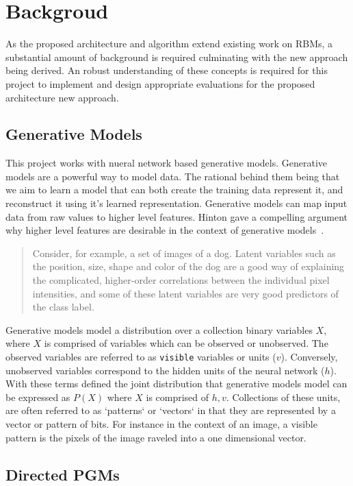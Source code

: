 \chapter{Backgroud}
As the proposed architecture and algorithm extend existing work on RBMs, a substantial amount of background is required culminating with the new approach being derived. An robust understanding of these concepts is required for this project to implement and design appropriate evaluations for the proposed architecture new approach.

\section{Generative Models}\label{S:Generative-Models}

This project works with nueral network based generative models.
Generative models are a powerful way to model data. The rational behind them being that we aim to learn a model that can both create the training data represent it, and reconstruct it using it's learned representation. Generative models can map input data from raw values to higher level features. Hinton gave a compelling argument why higher level features are desirable in the context of generative models~\cite{hinton:32723:vv}. \begin{quote} Consider, for example, a set of images of a dog. Latent variables such as the position, size, shape and color of the dog are a good way of explaining the complicated, higher-order correlations between the individual pixel intensities, and some of these latent variables are very good predictors of the class label.\end{quote}

Generative models model a distribution over a collection binary variables $X$, where $X$ is comprised of variables which can be observed or unobserved. The observed variables are referred to as \texttt{visible} variables or units ($v$). Conversely, unobserved variables correspond to the hidden units of the neural network ($h$). With these terms defined the joint distribution that generative models model can be expressed as $P(X)$ where $X$ is comprised of $h,v$. Collections of these units, are often referred to as `patterns` or `vectors` in that they are represented by a vector or pattern of bits. For instance in the context of an image, a visible pattern is the pixels of the image raveled into a one dimensional vector.

\section{Directed PGMs}


